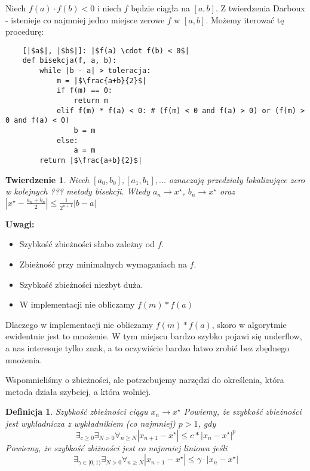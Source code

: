 \documentclass[hidelinks,a4paper,fleqn,oneside]{book}
\newcommand{\ra}{\rightarrow}
\newtheorem{defi}{Definicja}
\newtheorem{twierdz}{Twierdzenie}
\begin{document}
Niech $f(a) \cdot f(b) < 0$ i niech $f$ będzie ciągła na $[a, b]$. Z twierdzenia Darboux - istenieje co najmniej jedno miejsce zerowe $f$ w $[a, b]$. Możemy iterować tę procedurę:
\begin{verbatim}
    [|$a$|, |$b$|]: |$f(a) \cdot f(b) < 0$|
    def bisekcja(f, a, b):
        while |b - a| > toleracja:
            m = |$\frac{a+b}{2}$|
            if f(m) == 0:
                return m
            elif f(m) * f(a) < 0: # (f(m) < 0 and f(a) > 0) or (f(m) > 0 and f(a) < 0)
                b = m
            else:
                a = m
        return |$\frac{a+b}{2}$|
\end{verbatim}

\begin{twierdz}
	Niech $[a_0, b_0], [a_1, b_1], ...$ oznaczają przedziały lokalizujące zero w kolejnych ??? metody bisekcji. Wtedy $a_n \ra x^\star$, $b_n \ra x^\star$ oraz $|x^\star - \frac{a_n+b_n}{2}| \leq \frac{1}{2^{n+1}}|b - a|$
\end{twierdz}

\textbf{Uwagi:}
\begin{itemize}
	\item Szybkość zbieżności słabo zależny od $f$.
	\item Zbieżność przy minimalnych wymaganiach na $f$.
	\item Szybkość zbieżności niezbyt duża.
	\item W implementacji nie obliczamy $f(m)*f(a)$
\end{itemize}

Dlaczego w implementacji nie obliczamy $f(m)*f(a)$, skoro w algorytmie ewidentnie jest to mnożenie. W tym miejscu bardzo szybko pojawi się underflow, a nas interesuje tylko znak, a to oczywiście bardzo łatwo zrobić bez zbędnego mnożenia.

Wspomnieliśmy o zbieżności, ale potrzebujemy narzędzi do określenia, która metoda działa szybciej, a która wolniej.

\begin{defi}{Szybkość zbieżności ciągu $x_n \ra x^\star$}
	Powiemy, że szybkość zbieżności jest wykładnicza z wykładnikiem (co najmniej) $p>1$, gdy
	\[
		\exists_{c \geq 0} \exists_{N > 0} \forall_{n \geq N} |x_{n+1}-x^\star| \leq c * |x_n - x^\star|^p
	\]
	Powiemy, że szybkość zbiżności jest co najmniej liniowa jeśli
	\[
		\exists_{\gamma \in [0, 1)} \exists_{N > 0}  \forall_{n \geq N}  |x_{n+1}-x^\star| \leq \gamma \cdot |x_n - x^\star|
	\]
\end{defi}
\end{document}
